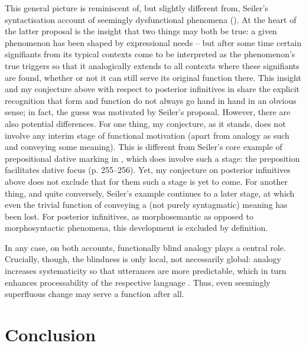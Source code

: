 \documentclass[output=paper,hidelinks]{langscibook}
\begin{document}
This general picture is reminiscent of, but slightly different from, Seiler’s syntactisation account of seemingly dysfunctional phenomena (\citealt{Seiler2015}). At the heart of the latter proposal is the insight that two things may both be true: a given phenomenon has been shaped by expressional needs – but after some time certain signifiants from its typical contexts come to be interpreted as the phenomenon’s true triggers so that it analogically extends to all contexts where these signifiants are found, whether or not it can still serve its original function there. This insight and my conjecture above with respect to posterior infinitives in  share the explicit recognition that form and function do not always go hand in hand in an obvious sense; in fact, the guess was motivated by Seiler’s proposal. However, there are also potential differences. For one thing, my conjecture, as it stands, does not involve any interim stage of functional motivation (apart from analogy as such and conveying some meaning). This is different from Seiler’s core example of prepositional dative marking in  \citep[252–257]{Seiler2015}, which does involve such a stage: the preposition facilitates dative focus (p. 255–256). Yet, my conjecture on posterior infinitives above does not exclude that for them such a stage is yet to come. For another thing, and quite conversely, Seiler’s example continues to a later stage, at which even the trivial function of conveying a (not purely syntagmatic) meaning has been lost. For posterior infinitives, as morphosemantic as opposed to morphosyntactic phenomena, this development is excluded by definition.

In any case, on both accounts, functionally blind analogy plays a central role. Crucially, though, the blindness is only local, not necessarily global: analogy increases systematicity so that utterances are more predictable, which in turn enhances processability of the respective language \citep[247–248]{Seiler2015}. Thus, even seemingly superfluous change may serve a function after all.

\section{Conclusion}
\end{document}
